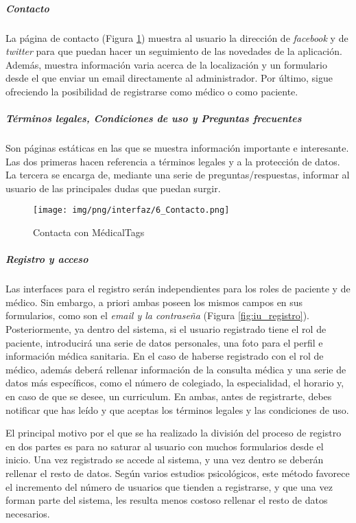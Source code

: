 \documentclass[a4paper,oneside,11pt]{book}
\begin{document}
		\subparagraph{Contacto} %
		\label{par:contacto}
			La página de contacto (Figura \ref{fig:iu_contacto}) muestra al usuario la dirección de \textit{facebook} y de \textit{twitter} para que puedan hacer un seguimiento de las novedades de la aplicación. Además, muestra información varia acerca de la localización y un formulario desde el que enviar un email directamente al administrador. Por último, sigue ofreciendo la posibilidad de registrarse como médico o como paciente.
		
		\subparagraph{Términos legales, Condiciones de uso y Preguntas frecuentes} %
		\label{par:terminos_legales_y_condiciones_de_uso}
			Son páginas estáticas en las que se muestra información importante e interesante. Las dos primeras hacen referencia a términos legales y a la protección de datos. La tercera se encarga de, mediante una serie de preguntas/respuestas, informar al usuario de las principales dudas que puedan surgir.
		
		
		\begin{figure}[H]
		  \centering
		    \texttt{[image: img/png/interfaz/6\_Contacto.png]}
		  \caption{Contacta con MédicalTags}
		  \label{fig:iu_contacto}
		\end{figure}
	
			
	
		\subparagraph{Registro y acceso} %
			\label{par:registro_y_acceso}
	
			Las interfaces para el registro serán independientes para los roles de paciente y de médico. Sin embargo, a priori ambas poseen los mismos campos en sus formularios, como son el \textit{email y la contraseña} (Figura \ref{fig:iu_registro}). Posteriormente, ya dentro del sistema, si el usuario registrado tiene el rol de paciente, introducirá una serie de datos personales, una foto para el perfil e información médica sanitaria. En el caso de haberse registrado con el rol de médico, además deberá rellenar información de la consulta médica y una serie de datos más específicos, como el número de colegiado, la especialidad, el horario y, en caso de que se desee, un curriculum. En ambas, antes de registrarte, debes notificar que has leído y que aceptas los términos legales y las condiciones de uso. 
			
			El principal motivo por el que se ha realizado la división del proceso de registro en dos partes es para no saturar al usuario con muchos formularios desde el inicio. Una vez registrado se accede al sistema, y una vez dentro se deberán rellenar el resto de datos. Según varios estudios psicológicos, este método favorece el incremento del número de usuarios que tienden a registrarse, y que una vez forman parte del sistema, les resulta menos costoso rellenar el resto de datos necesarios.
			
\end{document}
